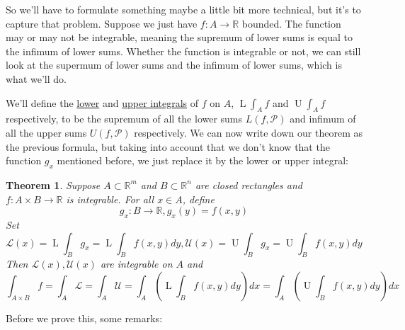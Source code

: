 \documentclass{article}
\newtheorem{theorem}{Theorem}
\newcommand{\reals}[0]{\mathbb{R}}
\newcommand{\mc}[1]{\mathcal{#1}}
\newcommand{\loint}[0]{\operatorname{L}\int}
\newcommand{\hiint}[0]{\operatorname{U}\int}
\begin{document}
So we'll have to formulate something maybe a little bit more technical, but it's to capture that problem. Suppose we just have \(f: A \to \reals\) bounded. The function may or may not be integrable, meaning the supremum of lower sums is equal to the infimum of lower sums. Whether the function is integrable or not, we can still look at the supermum of lower sums and the infimum of lower sums, which is what we'll do.

We'll define the \underline{lower} and \underline{upper integrals} of \(f\) on \(A\), \(\loint_Af\) and \(\hiint_Af\) respectively, to be the supremum of all the lower sums \(L(f, \mc{P})\) and infimum of all the upper sums \(U(f, \mc{P})\) respectively. We can now write down our theorem as the previous formula, but taking into account that we don't know that the function \(g_x\) mentioned before, we just replace it by the lower or upper integral:
\begin{theorem}
  Suppose \(A \subset \reals^m\) and \(B \subset \reals^n\) are closed rectangles and \(f: A \times B \to \reals\) is integrable. For all \(x \in A\), define
  \begin{equation}
    g_x: B \to \reals, g_x(y) = f(x, y)
  \end{equation}
  Set
  \begin{equation}
    \mc{L}(x) = \loint_Bg_x = \loint_Bf(x, y)dy, \mc{U}(x) = \hiint_Bg_x = \hiint_Bf(x, y)dy
  \end{equation}
  Then \(\mc{L}(x), \mc{U}(x)\) are integrable on \(A\) and
  \begin{equation}
    \int_{A \times B}f = \int_A\mc{L} = \int_A\mc{U} = \int_A\left(\loint_Bf(x, y)dy\right)dx = \int_A\left(\hiint_Bf(x, y)dy\right)dx
  \end{equation}
\end{theorem}
Before we prove this, some remarks:
\end{document}
